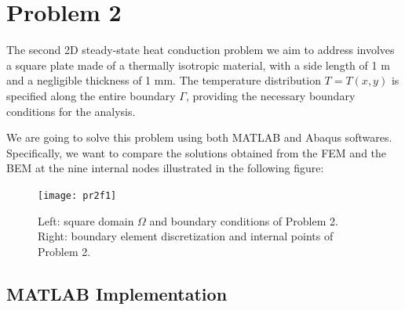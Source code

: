 
\section{Problem 2}
\label{sec:problem_2}%

The second 2D steady-state heat conduction problem we aim to address involves a square plate made of a thermally isotropic material, with a side length of 1 m and a negligible thickness of 1 mm. The temperature distribution $T=T(x,y)$ is specified along the entire boundary $\Gamma$, providing the necessary boundary conditions for the analysis. 

We are going to solve this problem using both MATLAB and Abaqus softwares. Specifically, we want to compare the solutions obtained from the FEM and the BEM at the nine internal nodes illustrated in the following figure:
\begin{figure}[H]
    \centering
    \texttt{[image: pr2f1]}
    \caption{Left: square domain $\Omega$ and boundary conditions of Problem 2. Right: boundary element discretization and internal points of Problem 2.}
    \label{fig:2pr2f1}
\end{figure}

\subsection{MATLAB Implementation}
\label{sub:MATLAB_implementation3}%

